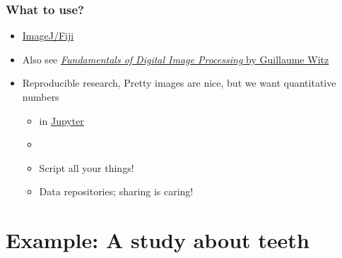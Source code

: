 \begin{frame}
  \frametitle{What to use?}
  \begin{itemize}
    \item \href{http://fiji.sc/}{ImageJ/Fiji}~\cite{Schindelin2012}
    \item Also see \href{https://ilias.unibe.ch/goto_ilias3_unibe_sess_3022928.html}{\emph{Fundamentals of Digital Image Processing} by Guillaume Witz}
    \item Reproducible research, \ie{} Pretty images are nice, but we want quantitative numbers
      \begin{itemize}
        \item \href{https://www.python.org/}{\faPython} in \href{https://jupyter.org/}{Jupyter}~\cite{Kluyver2016}
        \item \href{https://git-scm.com/}{\faGit}
        \item Script all your things!
        \item Data repositories; \ie{} sharing is caring!
      \end{itemize}
  \end{itemize}
\end{frame}

\section{Example: A study about teeth}
